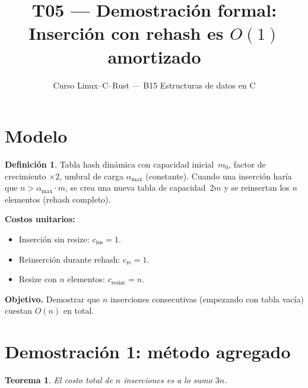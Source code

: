 \documentclass[11pt, letterpaper]{article}
\title{%
  T05 --- Demostración formal:\\[4pt]
  Inserción con rehash es $O(1)$ amortizado
}
\author{Curso Linux--C--Rust --- B15 Estructuras de datos en C}
\date{}
\theoremstyle{definition}
\newtheorem{definition}{Definición}[section]
\theoremstyle{plain}
\newtheorem{theorem}{Teorema}[section]
\theoremstyle{remark}
\begin{document}
\maketitle
\tableofcontents

\section{Modelo}

\begin{definition}
Tabla hash dinámica con capacidad inicial~$m_0$, factor de
crecimiento $\times 2$, umbral de carga $\alpha_{\max}$ (constante).
Cuando una inserción haría que $n > \alpha_{\max} \cdot m$, se crea
una nueva tabla de capacidad~$2m$ y se reinsertan los $n$ elementos
(rehash completo).
\end{definition}

\textbf{Costos unitarios:}
\begin{itemize}
  \item Inserción sin resize: $c_{\text{ins}} = 1$.
  \item Reinserción durante rehash: $c_{\text{re}} = 1$.
  \item Resize con $n$ elementos: $c_{\text{resize}} = n$.
\end{itemize}

\textbf{Objetivo.} Demostrar que $n$ inserciones consecutivas
(empezando con tabla vacía) cuestan $O(n)$ en total.

\section{Demostración 1: método agregado}

\begin{theorem}\label{thm:aggregate}
El costo total de $n$ inserciones es a lo sumo $3n$.
\end{theorem}
\end{document}
